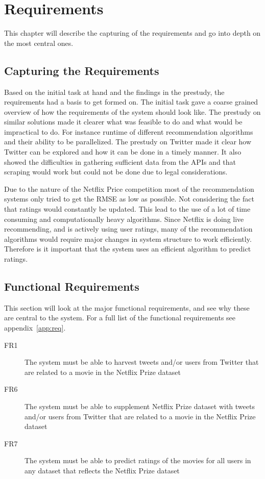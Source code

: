 
\chapter{Requirements}

\minitoc

This chapter will describe the capturing of the requirements and go into depth on the most central ones.

\clearpage

\section{Capturing the Requirements}
Based on the initial task at hand and the findings in the prestudy, the requirements had a basis to get formed on. The initial task gave a coarse grained overview of how the requirements of the system should look like. The prestudy on similar solutions made it clearer what was feasible to do and what would be impractical to do. For instance runtime of different recommendation algorithms and their ability to be parallelized. The prestudy on Twitter made it clear how Twitter can be explored and how it can be done in a timely manner. It also showed the difficulties in gathering sufficient data from the APIs and that scraping would work but could not be done due to legal considerations.

Due to the nature of the Netflix Price competition most of the recommendation systems only tried to get the RMSE as low as possible. Not considering the fact that ratings would constantly be updated. This lead to the use of a lot of time consuming and computationally heavy algorithms. Since Netflix is doing live recommending, and is actively using user ratings, many of the recommendation algorithms would require major changes in system structure to work efficiently. Therefore is it important that the system uses an efficient algorithm to predict ratings.


\section{Functional Requirements}\label{section:functional-requirements}
This section will look at the major functional requirements, and see why these are central to the system. For a full list of the functional requirements see appendix~\ref{app:req}.
\begin{description}
  \item[FR1] The system must be able to harvest tweets and/or users from Twitter that are related to a movie in the Netflix Prize dataset
  \item[FR6] The system must be able to supplement Netflix Prize dataset with tweets and/or users from Twitter that are related to a movie in the Netflix Prize dataset
  \item[FR7] The system must be able to predict ratings of the movies for all users in any dataset that reflects the Netflix Prize dataset
\end{description}

